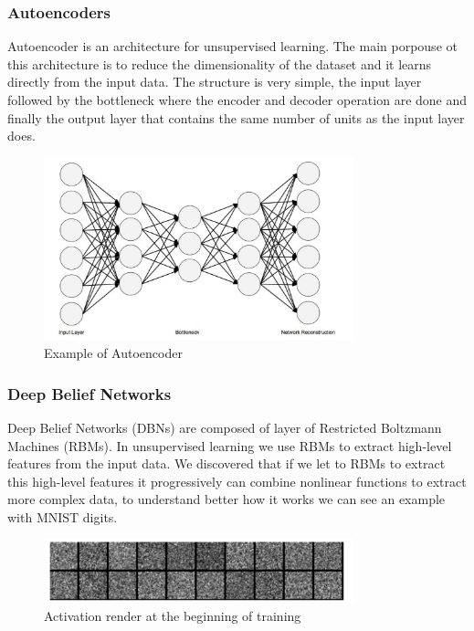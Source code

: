 \subsubsection[Autoencoders]{Autoencoders}

Autoencoder is an architecture for unsupervised learning. The main porpouse ot this architecture is to reduce the dimensionality of the dataset and it learns directly from the input data. 
The structure is very simple, the input layer followed by the bottleneck where the encoder and decoder operation are done and finally the output layer that contains the same number of units as the input layer does.\cite{dp4j-deep-learning}

\begin{figure}[H]
\centering
\includegraphics[width=0.8\textwidth]{./figures/autoencoder}
\caption{Example of Autoencoder \cite{dp4j-deep-learning}}
\end{figure}


\subsubsection[Deep Belief Networks]{Deep Belief Networks}
Deep Belief Networks (DBNs) are composed of layer of Restricted Boltzmann Machines (RBMs). In unsupervised learning we use RBMs to extract high-level features from the input data. We discovered that if we let to RBMs to extract this high-level features it progressively can combine nonlinear functions to extract more complex data, to understand better how it works we can see an example with MNIST digits.\cite{dp4j-deep-learning}


\begin{figure}[H]
\centering
\includegraphics[width=0.8\textwidth]{./figures/rbmm-1}
\caption{Activation render at the beginning of training \cite{dp4j-deep-learning}}
\end{figure}

